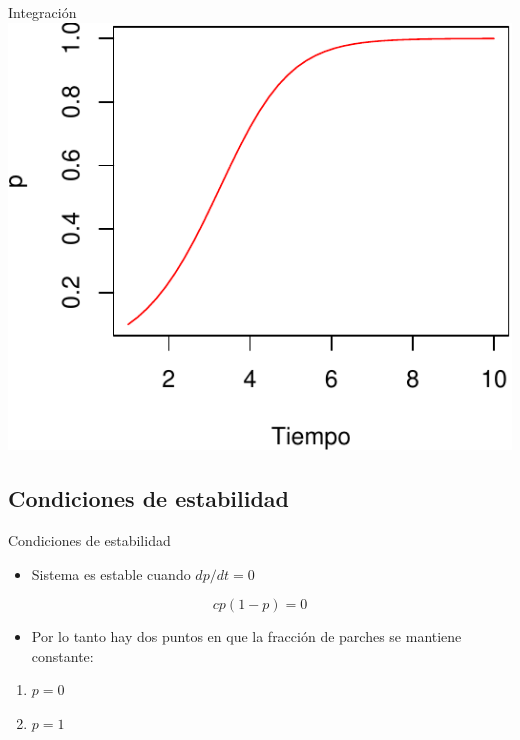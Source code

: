 \documentclass[
  11pt,
  ignorenonframetext,
]{beamer}
\providecommand{\tightlist}{%
  \setlength{\itemsep}{0pt}\setlength{\parskip}{0pt}}
\begin{document}
\begin{frame}{Integración}
\includegraphics{Modelos-meta_files/figure-beamer/unnamed-chunk-5-1.pdf}
\end{frame}

\hypertarget{condiciones-de-estabilidad}{%
\subsection{Condiciones de
estabilidad}\label{condiciones-de-estabilidad}}

\begin{frame}{Condiciones de estabilidad}
\begin{itemize}
\tightlist
\item
  Sistema es estable cuando \(dp/dt = 0\)
\end{itemize}

\[cp(1-p) = 0\]

\begin{itemize}
\tightlist
\item
  Por lo tanto hay dos puntos en que la fracción de parches se mantiene
  constante:
\end{itemize}

\begin{enumerate}
\item
  \(p = 0\)
\item
  \(p = 1\)
\end{enumerate}
\end{frame}
\end{document}
